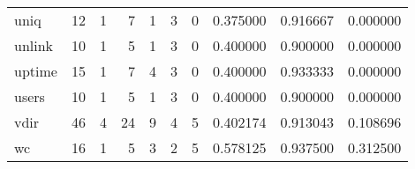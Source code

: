 \begin{longtable}{lrrrrrrrrr}
uniq      &                                       12 &                                                  1 &                                                  7 &                                                  1 &                                                  3 &                                                  0 &                                           0.375000 &                               0.916667 &                             0.000000 \\
unlink    &                                       10 &                                                  1 &                                                  5 &                                                  1 &                                                  3 &                                                  0 &                                           0.400000 &                               0.900000 &                             0.000000 \\
uptime    &                                       15 &                                                  1 &                                                  7 &                                                  4 &                                                  3 &                                                  0 &                                           0.400000 &                               0.933333 &                             0.000000 \\
users     &                                       10 &                                                  1 &                                                  5 &                                                  1 &                                                  3 &                                                  0 &                                           0.400000 &                               0.900000 &                             0.000000 \\
vdir      &                                       46 &                                                  4 &                                                 24 &                                                  9 &                                                  4 &                                                  5 &                                           0.402174 &                               0.913043 &                             0.108696 \\
wc        &                                       16 &                                                  1 &                                                  5 &                                                  3 &                                                  2 &                                                  5 &                                           0.578125 &                               0.937500 &                             0.312500 \\

\end{longtable}
